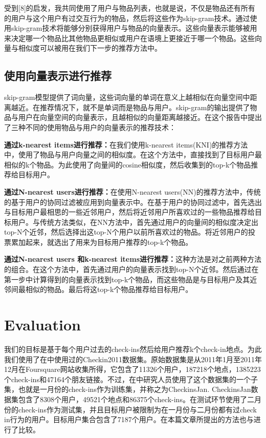 \documentclass[UTF8]{ctexart}
\begin{document}
	受到[8]的启发，我共同使用了用户与物品列表，也就是说，不仅是物品还有所有的用户与这个用户有过交互行为的物品，然后将这些作为skip-gram技术。通过使用skip-gram技术将能够分别获得用户与物品的向量表示。这些向量表示能够被用来决定哪一个物品比其他物品更相似或用户在语境上更接近于哪一个物品。这些向量与相似度可以被用在我们下一步的推荐方法中。
	
	\subsection{使用向量表示进行推荐}
	skip-gram模型提供了词向量，这些词向量的单词在意义上越相似在向量空间中距离越近。在推荐情况下，就不是单词而是物品与用户。skip-gram的输出提供了物品与用户在向量空间的向量表示，且越相似的向量距离越接近。在这个报告中提出了三种不同的使用物品与用户的向量表示的推荐技术：
	
	\textbf{通过k-nearest items进行推荐：}在我们使用k-nearest items(KNI)的推荐方法中，使用了物品与用户向量之间的相似度。在这个方法中，直接找到了目标用户最相似的k个物品。为此使用了向量间的cosine相似度，然后收集到的top-k个物品推荐给目标用户。
	
	\textbf{通过N-nearest users进行推荐：}在使用N-nearest users(NN)的推荐方法中，传统的基于用户的协同过滤被应用到向量表示中。在基于用户的协同过滤中，首先选出与目标用户最相思的一些近邻用户，然后将近邻用户所喜欢过的一些物品推荐给目标用户。与传统方法类似，在NN方法中，首先通过用户的向量间的相似度决定出top-N个近邻，然后选择出这top-N个用户以前所喜欢过的物品。将近邻用户的投票累加起来，就选出了用来为目标用户推荐的top-k个物品。
	
	\textbf{通过N-nearest users 和k-nearest items进行推荐：}这种方法是对之前两种方法的组合。在这个方法中，首先通过用户的向量表示找到top-N个近邻。然后通过在第一步中计算得到的向量表示找到top-k个物品，而这些物品是与目标用户及其近邻间最相似的物品。最后将这top-k个物品推荐给目标用户。
	
	
	\section{Evaluation}
	我们的目标是基于每个用户过去的check-ins然后给用户推荐k个check-in地点。为此我们使用了在\cite{gao2012exploring,ozsoy2014multi}中使用过的Checkin2011数据集。原始数据集是从2011年1月至2011年12月在Foursquare网站收集所得，它包含了11326个用户，187218个地点，1385223个check-ins和47164个朋友链接。不过，在\cite{ozsoy2014multi}中研究人员使用了这个数据集的一个子集，也就是一月份的check-ins作为训练集，并称之为CheckinsJan. CheckinsJan数据集包含了8308个用户，49521个地点和86375个check-ins。在测试环节使用了二月份的check-ins作为测试集，并且目标用户被限制为在一月份与二月份都有过check in行为的用户。目标用户集合包含了7187个用户。在本篇文章所提出的方法也与\cite{gao2012exploring,ozsoy2014multi}进行了比较。
	
\end{document}
